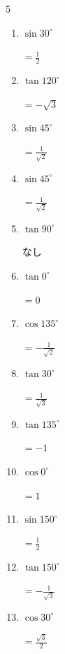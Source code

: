 \begin{multicols}{5}
\begin{enumerate}
  \item $\displaystyle \sin{30^\circ}$

        $\displaystyle =\frac{1}{2}$

  \item $\displaystyle \tan{120^\circ}$

        $\displaystyle =-\sqrt{3}$

  \item $\displaystyle \sin{45^\circ}$

        $\displaystyle =\frac{1}{\sqrt{2}}$

  \item $\displaystyle \sin{45^\circ}$

        $\displaystyle =\frac{1}{\sqrt{2}}$

  \item $\displaystyle \tan{90^\circ}$

        $\displaystyle なし$

  \item $\displaystyle \tan{0^\circ}$

        $\displaystyle =0$

  \item $\displaystyle \cos{135^\circ}$

        $\displaystyle =-\frac{1}{\sqrt{2}}$

  \item $\displaystyle \tan{30^\circ}$

        $\displaystyle =\frac{1}{\sqrt{3}}$

  \item $\displaystyle \tan{135^\circ}$

        $\displaystyle =-1$

  \item $\displaystyle \cos{0^\circ}$

        $\displaystyle =1$

  \item $\displaystyle \sin{150^\circ}$

        $\displaystyle =\frac{1}{2}$

\columnbreak %

  \item $\displaystyle \tan{150^\circ}$

        $\displaystyle =-\frac{1}{\sqrt{3}}$

  \item $\displaystyle \cos{30^\circ}$

        $\displaystyle =\frac{\sqrt{3}}{2}$


\end{enumerate}
\end{multicols}
